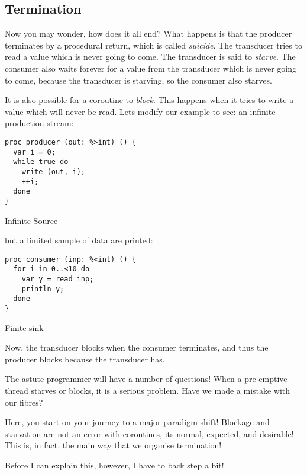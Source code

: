 \documentclass[oneside]{book}
\begin{document}
\subsection{Termination}
Now you may wonder, how does it all end? What happens is that
the producer terminates by a procedural return, which is
called {\em suicide}. The transducer tries to read a value
which is never going to come. The transducer is said to {\em starve}.
The consumer also waits forever for a value from the transducer
which is never going to come, because the transducer is starving,
so the consumer also starves.

It is also possible for a coroutine to {\em block}. This happens when
it tries to write a value which will never be read. Lets modify
our example to see: an infinite production stream:

\begin{listing}[h]
\begin{verbatim}
proc producer (out: %>int) () {
  var i = 0;
  while true do
    write (out, i);
    ++i;
  done
}
\end{verbatim}
\caption{Infinite Source}
\label{lst:infinite source}
\end{listing}

but a limited sample of data are printed:

\begin{listing}
\begin{verbatim}
proc consumer (inp: %<int) () {
  for i in 0..<10 do
    var y = read inp;
    println y;
  done
}
\end{verbatim}
\caption{Finite sink}
\label{lst:finite sink}
\end{listing}

Now, the transducer blocks when the consumer terminates, and thus
the producer blocks because the transducer has.

The astute programmer will have a number of questions!
When a pre-emptive thread starves or blocks, it is a serious
problem. Have we made a mistake with our fibres?

Here, you start on your journey to a major paradigm shift!
Blockage and starvation are not an error with coroutines,
its normal, expected, and desirable! This is, in fact,
the main way that we organise termination!

Before I can explain this, however, I have to back step a bit!
\end{document}
